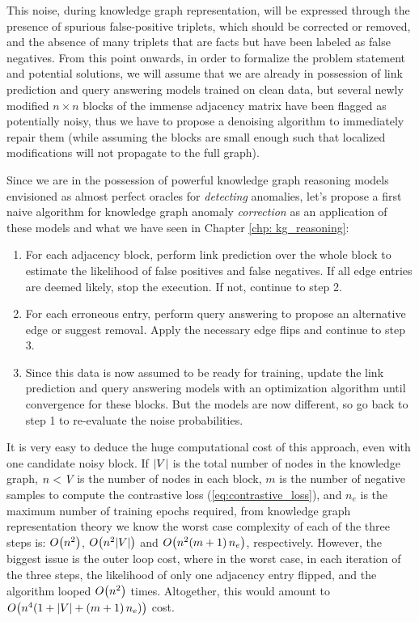 This noise, during knowledge graph representation, will be expressed through the presence of spurious false-positive triplets, which should be corrected or removed, and the absence of many triplets that are facts but have been labeled as false negatives. From this point onwards, in order to formalize the problem statement and potential solutions, we will assume that we are already in possession of link prediction and query answering models trained on clean data, but several newly modified $n \times n$ blocks of the immense adjacency matrix have been flagged as potentially noisy, thus we have to propose a denoising algorithm to immediately repair them (while assuming the blocks are small enough such that localized modifications will not propagate to the full graph).

Since we are in the possession of powerful knowledge graph reasoning models envisioned as almost perfect oracles for \emph{detecting} anomalies, let's propose a first naive algorithm for knowledge graph anomaly \emph{correction} as an application of these models and what we have seen in Chapter \ref{chp: kg_reasoning}:

\begin{enumerate}
    \item For each adjacency block, perform link prediction over the whole block to estimate the likelihood of false positives and false negatives. If all edge entries are deemed likely, stop the execution. If not, continue to step 2.
    \item For each erroneous entry, perform query answering to propose an alternative edge or suggest removal. Apply the necessary edge flips and continue to step 3.
    \item Since this data is now assumed to be ready for training, update the link prediction and query answering models with an optimization algorithm until convergence for these blocks. But the models are now different, so go back to step 1 to re-evaluate the noise probabilities.
\end{enumerate}

It is very easy to deduce the huge computational cost of this approach, even with one candidate noisy block. If $\mathopen{}\left|V\right|$ is the total number of nodes in the knowledge graph, $n < \emph{V}$ is the number of nodes in each block, $m$ is the number of negative samples to compute the contrastive loss (\ref{eq:contrastive_loss}), and $n_e$ is the maximum number of training epochs required, from knowledge graph representation theory we know the worst case complexity of each of the three steps is: $O\mathopen{}\left(n^2\right)$, $O\mathopen{}\left(n^2|V|\right)$ and $O\mathopen{}\left(n^2 \mathopen{}\left(m+1\right)n_e\right)$, respectively. However, the biggest issue is the outer loop cost, where in the worst case, in each iteration of the three steps, the likelihood of only one adjacency entry flipped, and the algorithm looped $O\mathopen{}\left(n^2\right)$ times. Altogether, this would amount to $O\mathopen{}\left(n^4\mathopen{}\left(1+|V|+\mathopen{}\left(m+1\right)n_e\right)\right)$ cost. 

